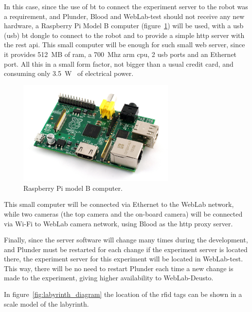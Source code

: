 In this case, since the use of \acrlong{bt} to connect the experiment server to the robot was a
requirement, and Plunder, Blood and WebLab-test should not receive any new hardware, a Raspberry Pi
Model B computer (figure~\ref{fig:rasp}) will be used, with a \acrshort{usb} (\acrlong{usb})
\acrlong{bt} dongle to connect to the robot and to provide a simple \acrshort{http} server with the
\acrshort{rest} \acrshort{api}. This small computer will be enough for such small web server, since
it provides 512~MB of \acrshort{ram}, a 700~Mhz \acrshort{arm} \acrshort{cpu}, 2 \acrshort{usb}
ports and an Ethernet port. All this in a small form factor, not bigger than a usual credit card,
and consuming only 3.5~W~\cite{rasp_b} of electrical power.

\begin{figure}[!htbp]
	\centering
	\includegraphics[width=0.7\textwidth]{fig/rasp.jpg}
	\caption{Raspberry Pi model B computer.}
	\label{fig:rasp}
\end{figure}

This small computer will be connected via Ethernet to the WebLab network, while two cameras (the top
camera and the on-board camera) will be connected via Wi-Fi to WebLab camera network, using Blood as
the \acrshort{http} proxy server.

Finally, since the server software will change many times during the development, and Plunder must
be restarted for each change if the experiment server is located there, the experiment server for
this experiment will be located in WebLab-test. This way, there will be no need to restart Plunder
each time a new change is made to the experiment, giving higher availability to WebLab-Deusto.

In figure~\ref{fig:labyrinth_diagram} the location of the \acrshort{rfid} tags can be shown in a
scale model of the labyrinth.

